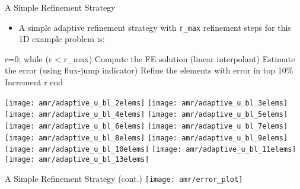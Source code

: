 \begin{frame}[fragile]{A Simple Refinement Strategy}

  \begin{itemize}
    \item A simple adaptive refinement strategy with \texttt{r\_max} refinement steps
      for this 1D example problem is:
  \end{itemize}


\small
\begin{semiverbatim}
r=0;
while (r < r_max)
  Compute the FE solution (linear interpolant)
  Estimate the error (using flux-jump indicator)
  Refine the elements with error in top 10\%
  Increment r
end
\end{semiverbatim}
\end{frame}


\begin{frame}
   {  \texttt{[image: amr/adaptive\_u\_bl\_2elems]} }
   {  \texttt{[image: amr/adaptive\_u\_bl\_3elems]} }
   {  \texttt{[image: amr/adaptive\_u\_bl\_4elems]} }
   {  \texttt{[image: amr/adaptive\_u\_bl\_5elems]} }
   {  \texttt{[image: amr/adaptive\_u\_bl\_6elems]} }
   {  \texttt{[image: amr/adaptive\_u\_bl\_7elems]} }
   {  \texttt{[image: amr/adaptive\_u\_bl\_8elems]} }
   {  \texttt{[image: amr/adaptive\_u\_bl\_9elems]} }
   {  \texttt{[image: amr/adaptive\_u\_bl\_10elems]} }
   {  \texttt{[image: amr/adaptive\_u\_bl\_11elems]} }
   {  \texttt{[image: amr/adaptive\_u\_bl\_13elems]} }
\end{frame}



\begin{frame}{A Simple Refinement Strategy (cont.)}
  \texttt{[image: amr/error\_plot]}
\end{frame}



